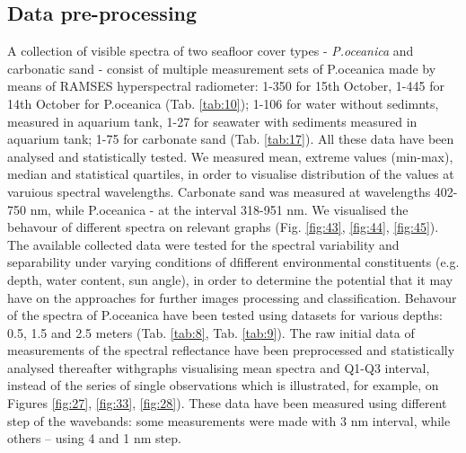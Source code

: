 \documentclass[10pt, a4paper]{article}
\begin{document}
\subsection{Data pre-processing}
A collection of visible spectra of two seafloor cover types - \textit{P.oceanica} and carbonatic sand - consist of multiple measurement sets of P.oceanica made by means of RAMSES hyperspectral radiometer: 1-350 for 15th October, 1-445 for 14th October for P.oceanica (Tab. \ref{tab:10}); 1-106 for water without sedimnts, measured in aquarium tank, 1-27 for seawater with sediments measured in aquarium tank; 1-75 for carbonate sand (Tab. \ref{tab:17}). All these data have been analysed and statistically tested. We measured mean, extreme values (min-max), median and statistical quartiles, in order to visualise distribution of the values at varuious spectral wavelengths. Carbonate sand was measured at wavelengths 402-750 nm, while P.oceanica - at the interval 318-951 nm. We visualised the behavour of different spectra on relevant graphs (Fig. \ref{fig:43}, \ref{fig:44}, \ref{fig:45}). 
The available collected data were tested for the spectral variability and separability under varying conditions of dfifferent environmental
constituents (e.g. depth, water content, sun angle), in order to determine the
potential that it may have on the approaches for further images processing and classification. Behavour of the spectra of P.oceanica have been tested using datasets for various depths: 0.5, 1.5 and 2.5 meters (Tab. \ref{tab:8}, Tab. \ref{tab:9}). The raw
initial data of measurements of the spectral reflectance have been preprocessed and statistically analysed thereafter withgraphs visualising mean spectra and Q1-Q3 interval, instead of the series of single observations which is illustrated, for example, on Figures \ref{fig:27}, \ref{fig:33}, \ref{fig:28}). These data
have been measured using different step of the wavebands: some measurements
were made with 3 nm interval, while others – using 4 and 1 nm step.
\end{document}
